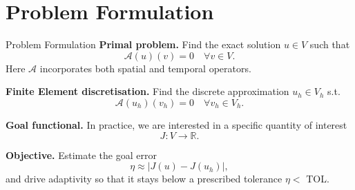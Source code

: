 \documentclass[aspectratio=169]{beamer}
\begin{document}
\section{Problem Formulation}
\begin{frame}{Problem Formulation}
\textbf{Primal problem.} Find the exact solution $u \in V$ such that 
$$\mathcal{A}(u)(v) = 0 \quad \forall v \in V.$$
Here $\mathcal{A}$ incorporates both spatial and temporal operators.
\vspace{0.5em}
\pause

\textbf{Finite Element discretisation.} Find the discrete approximation $u_h \in V_h$ s.t.
$$\mathcal{A}(u_h)(v_h) = 0 \quad \forall v_h \in V_h.$$
\vspace{-1em}
\pause

\textbf{Goal functional.} In practice, we are interested in a specific quantity of interest
$$J : V \to \mathbb{R}.$$
\vspace{-1em}
\pause

\textbf{Objective.} Estimate the goal error
$$\eta \approx |J(u) - J(u_h)|,$$
and drive adaptivity so that it stays below a prescribed tolerance $\eta < $ TOL.
\end{frame}


\end{document}
